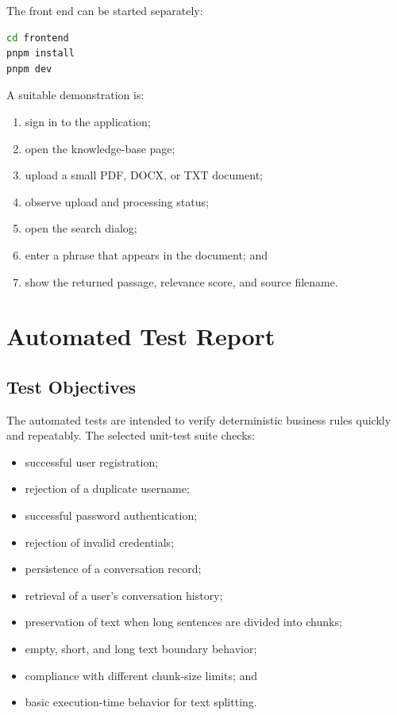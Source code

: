 \documentclass[11pt,a4paper]{article}
\begin{document}
The front end can be started separately:
\begin{lstlisting}[language=bash]
cd frontend
pnpm install
pnpm dev
\end{lstlisting}

A suitable demonstration is:
\begin{enumerate}[leftmargin=2em]
  \item sign in to the application;
  \item open the knowledge-base page;
  \item upload a small PDF, DOCX, or TXT document;
  \item observe upload and processing status;
  \item open the search dialog;
  \item enter a phrase that appears in the document; and
  \item show the returned passage, relevance score, and source filename.
\end{enumerate}

\section{Automated Test Report}

\subsection{Test Objectives}

The automated tests are intended to verify deterministic business rules quickly and
repeatably. The selected unit-test suite checks:
\begin{itemize}[leftmargin=2em]
  \item successful user registration;
  \item rejection of a duplicate username;
  \item successful password authentication;
  \item rejection of invalid credentials;
  \item persistence of a conversation record;
  \item retrieval of a user's conversation history;
  \item preservation of text when long sentences are divided into chunks;
  \item empty, short, and long text boundary behavior;
  \item compliance with different chunk-size limits; and
  \item basic execution-time behavior for text splitting.
\end{itemize}
\end{document}
